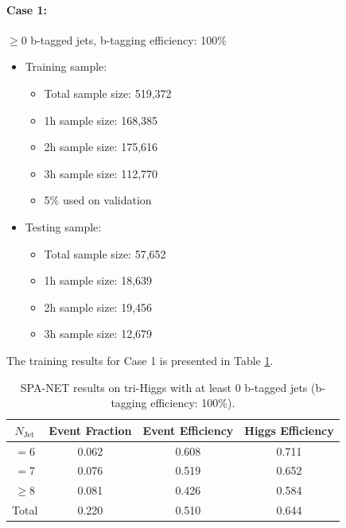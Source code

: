 \documentclass[12pt]{article}
\begin{document}
		\paragraph{Case 1:} $\ge 0$ b-tagged jets, b-tagging efficiency: 100\% 
		\begin{itemize}
			\item Training sample:
			\begin{itemize}
				\item Total sample size: 519,372
				\item 1h sample size: 168,385
				\item 2h sample size: 175,616
				\item 3h sample size: 112,770
				\item 5\% used on validation
			\end{itemize}
			\item Testing sample: 
				\begin{itemize}
					\item Total sample size: 57,652
					\item 1h sample size: 18,639
					\item 2h sample size: 19,456
					\item 3h sample size: 12,679
				\end{itemize}
		\end{itemize}
		The training results for Case 1 is presented in Table \ref{tab:SPANet_triHiggs_0btag_100}.
		\begin{table}[htpb]
			\centering
			\caption{SPA-NET results on tri-Higgs with at least 0 b-tagged jets (b-tagging efficiency: 100\%).}
			\label{tab:SPANet_triHiggs_0btag_100}
			\begin{tabular}{c|c|cc}
				$N_\text{Jet}$ & Event Fraction & Event Efficiency & Higgs Efficiency \\
				\hline
				$=6$	  &   0.062             &    0.608              &    0.711             \\
				$=7$	  &   0.076             &    0.519              &    0.652             \\
				$\ge 8$	  &   0.081             &    0.426              &    0.584             \\
				Total	  &   0.220             &    0.510              &    0.644             \\
			\end{tabular}
		\end{table}
\end{document}
